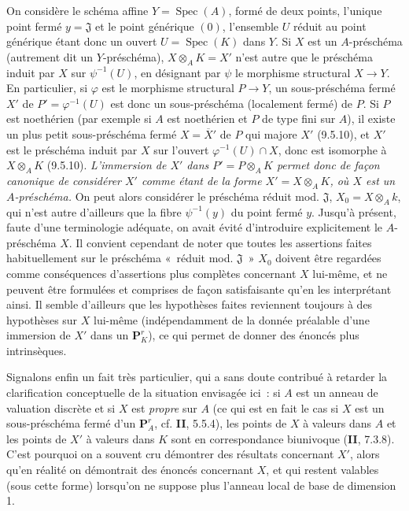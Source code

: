 \begin{env}[3.7.2]
On considère le schéma affine $Y=\operatorname{Spec}(A)$, formé de deux
points, l'unique point
fermé $y=\mathfrak{J}$ et le point générique $(0)$, l'ensemble $U$ réduit au
point générique étant donc un ouvert $U=\operatorname{Spec}(K)$ dans $Y$. Si
$X$ est un $A$-préschéma (autrement dit un $Y$-préschéma),
$X\otimes_A K=X'$ n'est autre que le préschéma induit par $X$ sur
$\psi^{-1}(U)$, en désignant par $\psi$ le morphisme structural $X\to Y$. En
particulier, si $\varphi$ est le morphisme structural $P\to Y$, un
sous-préschéma fermé $X'$ de $P'=\varphi^{-1}(U)$ est donc un sous-préschéma
(localement fermé) de $P$. Si $P$ est noethérien (par exemple si $A$ est
noethérien et $P$ de type fini sur $A$), il existe un plus petit
sous-préschéma fermé $X=\overline{X}'$ de $P$ qui majore $X'$ (9.5.10), et
$X'$ est le préschéma induit par $X$ sur l'ouvert
$\varphi^{-1}(U)\cap X$, donc est isomorphe à $X\otimes_A K$ (9.5.10).
\emph{L'immersion de $X'$ dans $P'=P\otimes_A K$ permet donc de façon
canonique de considérer $X'$ comme étant de la forme $X'=X\otimes_A K$, où
$X$ est un $A$-préschéma.} On peut alors considérer le préschéma réduit mod.
$\mathfrak{J}$, $X_0=X\otimes_A k$, qui n'est autre d'ailleurs que la fibre
$\psi^{-1}(y)$ du point fermé $y$. Jusqu'à présent, faute d'une terminologie
adéquate, on avait évité d'introduire explicitement le $A$-préschéma $X$. Il
convient cependant de noter que toutes les assertions faites habituellement
sur le préschéma «~réduit mod. $\mathfrak{J}$~» $X_0$ doivent être regardées
comme conséquences d'assertions plus complètes concernant $X$ lui-même, et ne
peuvent être formulées et comprises de façon satisfaisante qu'en les
interprétant ainsi. Il semble d'ailleurs que les hypothèses faites reviennent
toujours à des hypothèses sur $X$ lui-même (indépendamment de la donnée
préalable d'une immersion de $X'$ dans un $\mathbf{P}_K^r$), ce qui permet de
donner des énoncés plus intrinsèques.
\end{env}

\begin{env}[3.7.3]
\label{I.3.7.3-fr}
Signalons enfin un fait très particulier, qui a sans doute contribué à
retarder la clarification conceptuelle de la situation envisagée ici~: si
$A$ est un anneau de valuation discrète et si $X$ est \emph{propre} sur $A$
(ce qui est en fait le cas si $X$ est un sous-préschéma fermé d'un
$\mathbf{P}_A^r$, cf. \textbf{II}, 5.5.4), les points de $X$ à valeurs dans $A$ et les
points de $X'$ à valeurs dans $K$ sont en correspondance biunivoque
(\textbf{II}, 7.3.8). C'est pourquoi on a souvent cru démontrer des résultats
concernant $X'$, alors qu'en réalité on démontrait des énoncés concernant
$X$, et qui restent valables (sous cette forme) lorsqu'on ne suppose plus
l'anneau local de base de dimension 1.
\end{env}
